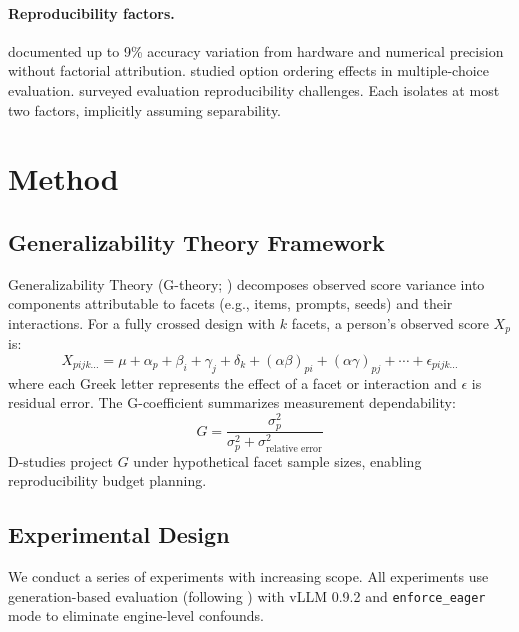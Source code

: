 \documentclass[11pt]{article}
\begin{document}
\paragraph{Reproducibility factors.}
\citet{yuan2025llm} documented up to 9\% accuracy variation from hardware and numerical precision without factorial attribution.
\citet{lu2022fantastically, pezeshkpour2024large} studied option ordering effects in multiple-choice evaluation.
\citet{biderman2024lessons} surveyed evaluation reproducibility challenges.
Each isolates at most two factors, implicitly assuming separability.

\section{Method}

\subsection{Generalizability Theory Framework}

Generalizability Theory (G-theory; \citealp{shavelson1991generalizability, brennan2001generalizability}) decomposes observed score variance into components attributable to facets (e.g., items, prompts, seeds) and their interactions.
For a fully crossed design with $k$ facets, a person's observed score $X_{p}$ is:
\begin{equation}
X_{pijk\ldots} = \mu + \alpha_p + \beta_i + \gamma_j + \delta_k + (\alpha\beta)_{pi} + (\alpha\gamma)_{pj} + \cdots + \epsilon_{pijk\ldots}
\end{equation}
where each Greek letter represents the effect of a facet or interaction and $\epsilon$ is residual error.
The G-coefficient summarizes measurement dependability:
\begin{equation}
G = \frac{\sigma^2_p}{\sigma^2_p + \sigma^2_{\text{relative error}}}
\end{equation}
D-studies project $G$ under hypothetical facet sample sizes, enabling reproducibility budget planning.

\subsection{Experimental Design}

We conduct a series of experiments with increasing scope.
All experiments use generation-based evaluation (following \citealp{hua2025emnlp}) with vLLM 0.9.2 and \texttt{enforce\_eager} mode to eliminate engine-level confounds.
\end{document}
